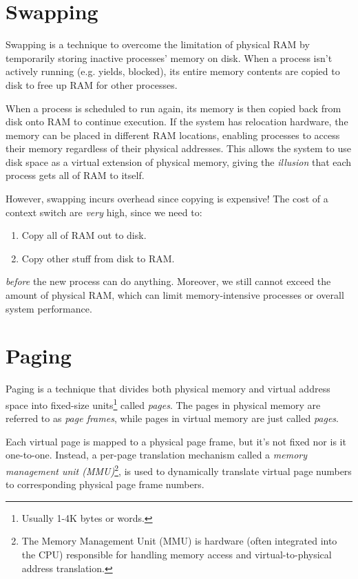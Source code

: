 \documentclass{report}
\begin{document}
\section{Swapping}
Swapping is a technique to overcome the limitation of physical RAM by temporarily storing inactive
processes' memory on disk. When a process isn't actively running (e.g. yields, blocked), its entire
memory contents are copied to disk to free up RAM for other processes.

When a process is scheduled to run again, its memory is then copied back from disk onto RAM to
continue execution. If the system has relocation hardware, the memory can be placed in different RAM
locations, enabling processes to access their memory regardless of their physical addresses. This
allows the system to use disk space as a virtual extension of physical memory, giving the 
\textit{illusion} that each process gets all of RAM to itself. 

However, swapping incurs overhead since copying is expensive! The cost of a context switch are
\textit{very} high, since we need to:

\begin{enumerate}[label=\textit{(\roman*)}]
\item Copy all of RAM out to disk.
\item Copy other stuff from disk to RAM.
\end{enumerate}
\textit{before} the new process can do anything. Moreover, we still cannot exceed the amount of
physical RAM, which can limit memory-intensive processes or overall system performance.





\section{Paging}
\label{sect:PGING}
Paging is a technique that divides both physical memory and virtual address space into fixed-size
units\footnote{Usually 1-4K bytes or words.} called \textit{pages}. The pages in physical memory are
referred to as \textit{page frames}, while pages in virtual memory are just called \textit{pages}.

Each virtual page is mapped to a physical page frame, but it's not fixed nor is it
one-to-one. Instead, a per-page translation mechanism called a \textit{memory management unit
  (MMU)}\footnote{The Memory Management Unit (MMU) is hardware (often integrated into the CPU)
  responsible for handling memory access and virtual-to-physical address translation.},
is used to dynamically translate virtual page numbers to corresponding physical page frame
numbers. 
\end{document}
